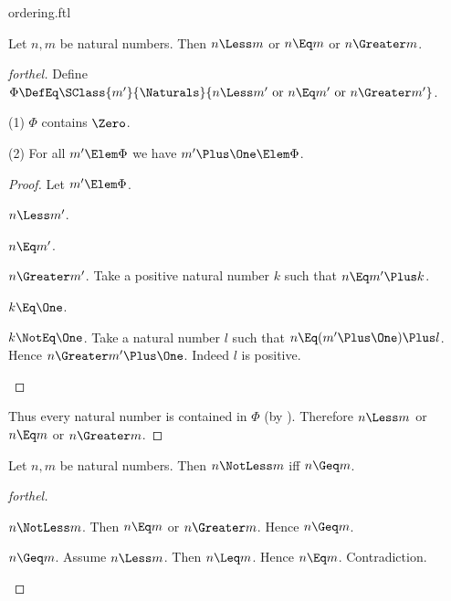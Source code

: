 \documentclass{stex}
\begin{document}
\begin{smodule}{ordering.ftl}
\begin{proposition*}[forthel]
  Let $n, m$ be natural numbers.
  Then $n \Less m$ or $n \Eq m$ or $n \Greater m$.
\end{proposition*}
\begin{proof}[forthel]
  Define $\Phi \DefEq \SClass{m'}{\Naturals}{n \Less m'\text{ or }n \Eq m'\text{ or }n \Greater m'}$.

  (1) $\Phi$ contains $\Zero$.

  (2) For all $m' \Elem \Phi$ we have $m' \Plus \One \Elem \Phi$.
  \begin{proof}
    Let $m' \Elem \Phi$.

    \begin{case}{$n \Less m'$.} \end{case}

    \begin{case}{$n \Eq m'$.} \end{case}

    \begin{case}{$n \Greater m'$.}
      Take a positive natural number $k$ such that $n \Eq m' \Plus k$.

      \begin{case}{$k \Eq \One$.} \end{case}

      \begin{case}{$k \NotEq \One$.}
        Take a natural number $l$ such that $n \Eq (m' \Plus \One) \Plus l$.
        Hence $n \Greater m' \Plus \One$.
        Indeed $l$ is positive.
      \end{case}
    \end{case}
  \end{proof}

  Thus every natural number is contained in $\Phi$ (by ).
  Therefore $n \Less m$ or $n \Eq m$ or $n \Greater m$.
\end{proof}

\begin{proposition*}[forthel]
  Let $n, m$ be natural numbers.
  Then $n \NotLess m$ iff $n \Geq m$.
\end{proposition*}
\begin{proof}[forthel]
  \begin{case}{$n \NotLess m$.}
    Then $n \Eq m$ or $n \Greater m$.
    Hence $n \Geq m$.
  \end{case}

  \begin{case}{$n \Geq m$.}
    Assume $n \Less m$.
    Then $n \Leq m$.
    Hence $n \Eq m$.
    Contradiction.
  \end{case}
\end{proof}


\end{smodule}
\end{document}
